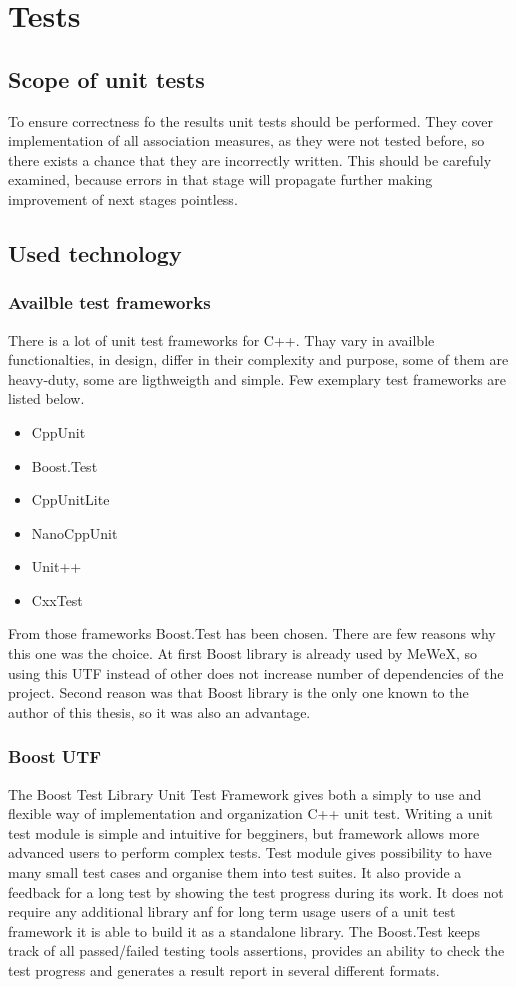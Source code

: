 \chapter{Tests}

\section{Scope of unit tests}
To ensure correctness fo the results unit tests should be performed. They cover implementation of all association measures, 
as they were not tested before, so there exists a chance that they are incorrectly written. This should be carefuly examined, 
because errors in that stage will propagate further making improvement of next stages pointless.



\section{Used technology}

\subsection{Availble test frameworks}
There is a lot of unit test frameworks for C++. Thay vary in availble functionalties, in design, differ in their complexity and purpose, 
some of them are heavy-duty, some are ligthweigth and simple. Few exemplary test frameworks are listed below.
\begin{itemize}
    \item CppUnit
    \item Boost.Test
    \item CppUnitLite
    \item NanoCppUnit
    \item Unit++
    \item CxxTest
\end{itemize}
From those frameworks Boost.Test has been chosen. There are few reasons why this one was the choice. 
At first Boost library is already used by MeWeX, so using this UTF instead of other does not increase number of dependencies of the project. 
Second reason was that Boost library is the only one known to the author of this thesis, so it was also an advantage.

\subsection{Boost UTF}
The Boost Test Library Unit Test Framework gives both a simply to use and flexible way of implementation and organization C++ unit test. 
Writing a unit test module is simple and intuitive for begginers, but framework allows more advanced users to perform complex tests. 
Test module gives possibility to have many small test cases and organise them into test suites. It also provide a feedback for a long test by 
showing the test progress during its work. It does not require any additional library anf for long term usage users of a unit test framework 
it is able to build it as a standalone library. The Boost.Test keeps track of all passed/failed testing tools assertions, 
provides an ability to check the test progress and generates a result report in several different formats.

